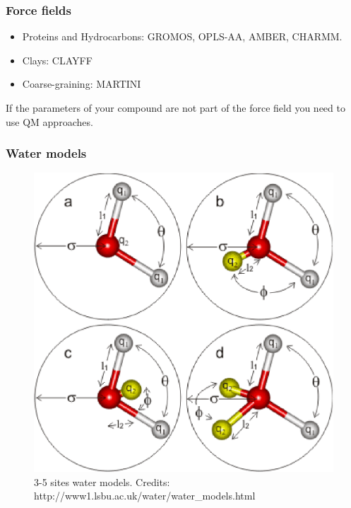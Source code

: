 \documentclass{beamer}
\begin{document}
\begin{frame}\frametitle{Force fields}

\begin{itemize}
\item Proteins and Hydrocarbons: GROMOS, OPLS-AA, AMBER, CHARMM.
\item Clays: CLAYFF
\item Coarse-graining: MARTINI
\end{itemize}

If the parameters of your compound are not part of the force field you need to use QM approaches.

\end{frame}

\begin{frame}\frametitle{Water models}

\begin{figure}
\includegraphics[scale=0.34]{h2o_models.eps}
\caption{{\scriptsize 3-5 sites water models. Credits: http://www1.lsbu.ac.uk/water/water\_models.html}}
\end{figure}

\end{frame}


%
%
\end{document}
